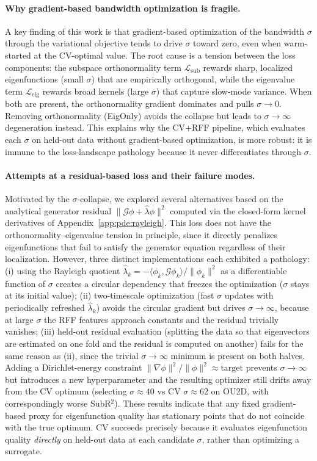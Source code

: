 \documentclass[11pt]{article}
\theoremstyle{remark}
\begin{document}
\paragraph{Why gradient-based bandwidth optimization is fragile.}
A key finding of this work is that gradient-based optimization of the bandwidth $\sigma$ through the variational objective tends to drive $\sigma$ toward zero, even when warm-started at the CV-optimal value.
The root cause is a tension between the loss components: the subspace orthonormality term $\mathcal{L}_{\mathrm{sub}}$ rewards sharp, localized eigenfunctions (small $\sigma$) that are empirically orthogonal, while the eigenvalue term $\mathcal{L}_{\mathrm{eig}}$ rewards broad kernels (large $\sigma$) that capture slow-mode variance.
When both are present, the orthonormality gradient dominates and pulls $\sigma\to 0$.
Removing orthonormality (EigOnly) avoids the collapse but leads to $\sigma\to\infty$ degeneration instead.
This explains why the CV+RFF pipeline, which evaluates each $\sigma$ on held-out data without gradient-based optimization, is more robust: it is immune to the loss-landscape pathology because it never differentiates through $\sigma$.

\paragraph{Attempts at a residual-based loss and their failure modes.}
Motivated by the $\sigma$-collapse, we explored several alternatives based on the analytical generator residual $\|\mathcal{G}\phi+\hat\lambda\phi\|^2$ computed via the closed-form kernel derivatives of Appendix~\ref{app:pde:rayleigh}.
This loss does not have the orthonormality--eigenvalue tension in principle, since it directly penalizes eigenfunctions that fail to satisfy the generator equation regardless of their localization.
However, three distinct implementations each exhibited a pathology:
(i) using the Rayleigh quotient $\hat\lambda_k=-\langle\phi_k,\mathcal{G}\phi_k\rangle/\|\phi_k\|^2$ as a differentiable function of $\sigma$ creates a circular dependency that freezes the optimization ($\sigma$ stays at its initial value);
(ii) two-timescale optimization (fast $\sigma$ updates with periodically refreshed $\hat\lambda_k$) avoids the circular gradient but drives $\sigma\to\infty$, because at large $\sigma$ the RFF features approach constants and the residual trivially vanishes;
(iii) held-out residual evaluation (splitting the data so that eigenvectors are estimated on one fold and the residual is computed on another) fails for the same reason as (ii), since the trivial $\sigma\to\infty$ minimum is present on both halves.
Adding a Dirichlet-energy constraint $\|\nabla\phi\|^2/\|\phi\|^2\approx\text{target}$ prevents $\sigma\to\infty$ but introduces a new hyperparameter and the resulting optimizer still drifts away from the CV optimum (selecting $\sigma\approx 40$ vs CV $\sigma\approx 62$ on OU2D, with correspondingly worse SubR$^2$).
These results indicate that any fixed gradient-based proxy for eigenfunction quality has stationary points that do not coincide with the true optimum.
CV succeeds precisely because it evaluates eigenfunction quality \emph{directly} on held-out data at each candidate $\sigma$, rather than optimizing a surrogate.
\end{document}

